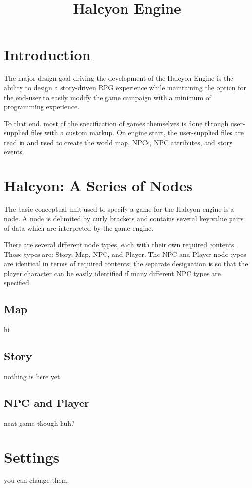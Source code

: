 \documentclass[11pt]{article}
\begin{document}
\title{Halcyon Engine}
\date{}
\maketitle{}

\section{Introduction}
The major design goal driving the development of the Halcyon Engine is the ability to design a story-driven RPG experience while maintaining the option for the end-user to easily modify the game campaign with a minimum of programming experience.

To that end, most of the specification of games themselves is done through user-supplied files with a custom markup.
On engine start, the user-supplied files are read in and used to create the world map, NPCs, NPC attributes, and story events.

\section{Halcyon: A Series of Nodes}
The basic conceptual unit used to specify a game for the Halcyon engine is a node.
A node is delimited by curly brackets and contains several key:value pairs of data which are interpreted by the game engine.

There are several different node types, each with their own required contents.
Those types are: Story, Map, NPC, and Player.
The NPC and Player node types are identical in terms of required contents; the separate designation is so that the player character can be easily identified if many different NPC types are specified.

\subsection{Map}
hi
\subsection{Story}
nothing is here yet
\subsection{NPC and Player}
neat game though huh?
\section{Settings}
you can change them.
\end{document}
